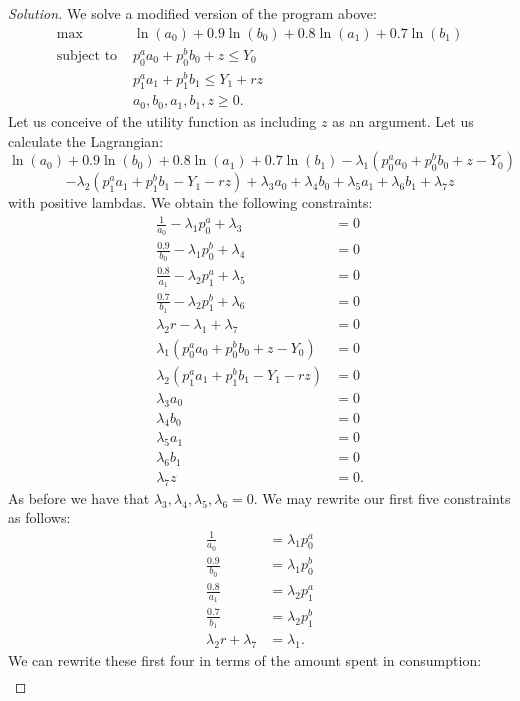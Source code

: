 \documentclass[12pt]{article}
\theoremstyle{definition}
\theoremstyle{remark}
\def\la{\lambda}
\begin{document}
\begin{proof}[Solution]
  We solve a modified version of the program above:
  \begin{align*}
    \max &\ln(a_0) + 0.9 \ln(b_0) + 0.8 \ln(a_1) + 0.7 \ln(b_1) \\
    \text{subject to } &p_0^aa_0 + p_0^bb_0 + z \leq Y_0 \\
    &p_1^aa_1 + p_1^bb_1 \leq Y_1 + rz \\
    &a_0, b_0, a_1, b_1, z \geq 0.
  \end{align*}
  Let us conceive of the utility function as including $z$ as an argument. Let us calculate the Lagrangian:
  $$ \ln(a_0) + 0.9 \ln(b_0) + 0.8 \ln(a_1) + 0.7 \ln(b_1) - \la_1(p_0^aa_0 + p_0^bb_0 + z - Y_0)$$
  $$ - \la_2(p_1^aa_1 + p_1^bb_1 - Y_1 - rz) + \la_3a_0 + \la_4b_0 + \la_5a_1 + \la_6b_1 + \la_7z $$
  with positive lambdas.
  We obtain the following constraints:
  \begin{align*}
    \frac{1}{a_0} - \la_1p_0^a + \la_3 &= 0 \\
    \frac{0.9}{b_0} - \la_1p_0^b + \la_4 &= 0 \\
    \frac{0.8}{a_1} - \la_2p_1^a + \la_5 &= 0 \\
    \frac{0.7}{b_1} - \la_2p_1^b + \la_6 &= 0 \\
    \la_2r - \la_1 + \la_7 &= 0 \\
    \la_1(p_0^aa_0 + p_0^bb_0 + z - Y_0) &= 0 \\
    \la_2(p_1^aa_1 + p_1^bb_1 - Y_1 - rz) &= 0 \\
    \la_3a_0 &= 0 \\
    \la_4b_0 &= 0 \\
    \la_5a_1 &= 0 \\
    \la_6b_1 &= 0 \\
    \la_7z &= 0.
  \end{align*}
  As before we have that $\la_3, \la_4, \la_5, \la_6 = 0$.
  We may rewrite our first five constraints as follows:
  \begin{align*}
    \frac{1}{a_0} &= \la_1p_0^a \\
    \frac{0.9}{b_0} &= \la_1p_0^b \\
    \frac{0.8}{a_1} &= \la_2p_1^a \\
    \frac{0.7}{b_1} &= \la_2p_1^b \\
    \la_2r + \la_7 &= \la_1.
  \end{align*}
  We can rewrite these first four in terms of the amount spent in consumption:
  \begin{align*}

\end{align*}
\end{proof}
\end{document}
